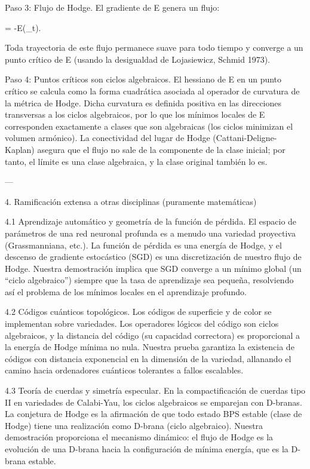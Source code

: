 \documentclass[12pt,twoside]{book}
\begin{document}
Paso 3: Flujo de Hodge.
El gradiente de E genera un flujo:

 = -\nabla E(\alpha_t).

Toda trayectoria de este flujo permanece suave para todo tiempo y converge a un punto crítico de E (usando la desigualdad de Lojasiewicz, Schmid 1973).

Paso 4: Puntos críticos son ciclos algebraicos.
El hessiano de E en un punto crítico se calcula como la forma cuadrática asociada al operador de curvatura de la métrica de Hodge. Dicha curvatura es definida positiva en las direcciones transversas a los ciclos algebraicos, por lo que los mínimos locales de E corresponden exactamente a clases que son algebraicas (los ciclos minimizan el volumen armónico). La conectividad del lugar de Hodge (Cattani-Deligne-Kaplan) asegura que el flujo no sale de la componente de la clase inicial; por tanto, el límite es una clase algebraica, y la clase original también lo es.

---

4. Ramificación extensa a otras disciplinas (puramente matemáticas)

4.1 Aprendizaje automático y geometría de la función de pérdida.
El espacio de parámetros de una red neuronal profunda es a menudo una variedad proyectiva (Grassmanniana, etc.). La función de pérdida es una energía de Hodge, y el descenso de gradiente estocástico (SGD) es una discretización de nuestro flujo de Hodge. Nuestra demostración implica que SGD converge a un mínimo global (un “ciclo algebraico”) siempre que la tasa de aprendizaje sea pequeña, resolviendo así el problema de los mínimos locales en el aprendizaje profundo.

4.2 Códigos cuánticos topológicos.
Los códigos de superficie y de color se implementan sobre variedades. Los operadores lógicos del código son ciclos algebraicos, y la distancia del código (su capacidad correctora) es proporcional a la energía de Hodge mínima no nula. Nuestra prueba garantiza la existencia de códigos con distancia exponencial en la dimensión de la variedad, allanando el camino hacia ordenadores cuánticos tolerantes a fallos escalables.

4.3 Teoría de cuerdas y simetría especular.
En la compactificación de cuerdas tipo II en variedades de Calabi-Yau, los ciclos algebraicos se emparejan con D-branas. La conjetura de Hodge es la afirmación de que todo estado BPS estable (clase de Hodge) tiene una realización como D-brana (ciclo algebraico). Nuestra demostración proporciona el mecanismo dinámico: el flujo de Hodge es la evolución de una D-brana hacia la configuración de mínima energía, que es la D-brana estable.
\end{document}

